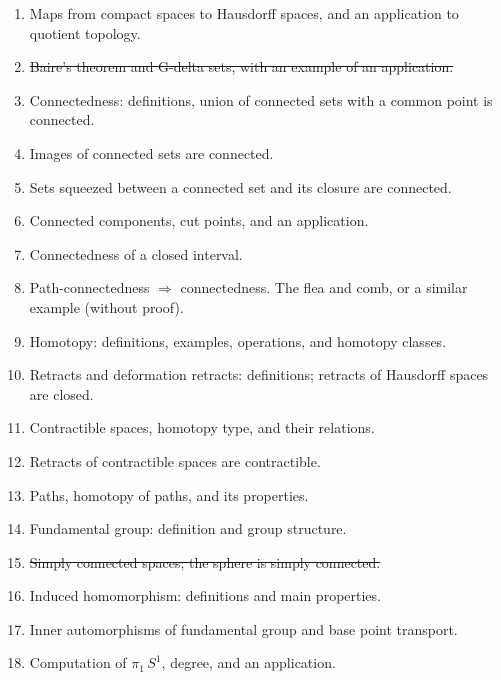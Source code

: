 \begin{enumerate}
\item Maps from compact spaces to Hausdorff spaces, and an application to quotient topology.

\item \sout{Baire's theorem and G-delta sets, with an example of an application.}

\item Connectedness: definitions, union of connected sets with a common point is connected.

\item Images of connected sets are connected.

\item Sets squeezed between a connected set and its closure are connected.

\item Connected components, cut points, and an application.

\item Connectedness of a closed interval.

\item Path-connectedness $\Rightarrow$ connectedness. The flea and comb, or a similar example (without proof).

\item Homotopy: definitions, examples, operations, and homotopy classes.

\item Retracts and deformation retracts: definitions; retracts of Hausdorff spaces are closed.

\item Contractible spaces, homotopy type, and their relations.

\item Retracts of contractible spaces are contractible.

\item Paths, homotopy of paths, and its properties.

\item Fundamental group: definition and group structure.

\item \sout{Simply connected spaces; the sphere is simply connected.}

\item Induced homomorphism: definitions and main properties.

\item Inner automorphisms of fundamental group and base point transport.

\item Computation of $\pi_1\,S^1$, degree, and an application.


\end{enumerate}
